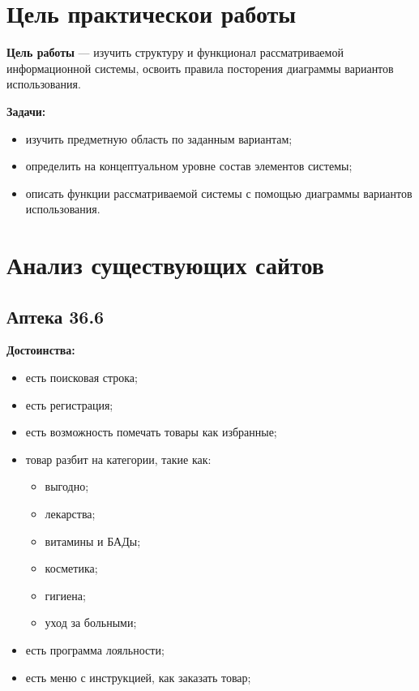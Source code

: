 \graphicspath{{./FirstTask/}} %

\section*{\Large Цель практическои работы}

\textbf{Цель работы} --- изучить структуру и функционал рассматриваемой
информационной системы, освоить правила посторения диаграммы вариантов
использования.

\textbf{Задачи:}\par
\begin{itemize}
	\item изучить предметную область по заданным вариантам;
	\item определить на концептуальном уровне состав элементов системы;
	\item описать функции рассматриваемой системы с помощью диаграммы 
		вариантов использования.
\end{itemize}
\newpage

\section{Анализ существующих сайтов}
\subsection{Аптека 36.6}

\textbf{Достоинства:}\par
\begin{itemize}
	\item есть поисковая строка;
	\item есть регистрация;
	\item есть возможность помечать товары как избранные;
	\item товар разбит на категории, такие как:
	\begin{itemize}
		\item выгодно;
		\item лекарства;
		\item витамины и БАДы;
		\item косметика;
		\item гигиена;
		\item уход за больными;
	\end{itemize}
	\item есть программа лояльности;
	\item есть меню с инструкцией, как заказать товар;
\end{itemize}

